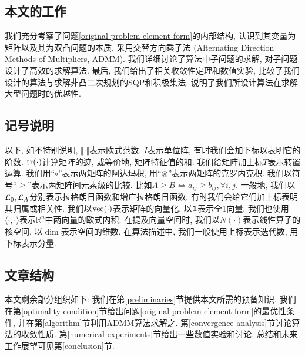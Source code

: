 \subsection{本文的工作}
我们充分考察了问题\eqref{original problem element form}的内部结构, 认识到其变量为矩阵以及其为双凸问题的本质, 采用交替方向乘子法 (Alternating Direction Methods of Multipliers, ADMM). 我们详细讨论了算法中子问题的求解, 对子问题设计了高效的求解算法. 最后, 我们给出了相关收敛性定理和数值实验, 比较了我们设计的算法与求解非凸二次规划的SQP和积极集法, 说明了我们所设计算法在求解大型问题时的优越性. 
\subsection{记号说明}
以下, 如不特别说明, $\Vert\cdot\Vert$表示欧式范数. $I$表示单位阵, 有时我们会加下标以表明它的阶数. $\mathrm{tr}(\cdot)$计算矩阵的迹, 或等价地, 矩阵特征值的和. 我们给矩阵加上标$T$表示转置运算. 我们用``$\circ$''表示两矩阵的阿达玛积, 用``$\otimes$''表示两矩阵的克罗内克积. 我们以符号``$\ge$''表示两矩阵间元素级的比较. 比如$A\ge B\Leftrightarrow a_{ij}\ge b_{ij},\forall i,j$. 一般地, 我们以$\mathcal{L}_0,\mathcal{L}_A$分别表示拉格朗日函数和增广拉格朗日函数. 有时我们会给它们加上标表明其归属或相关性. 我们以$\mathrm{vec}(\cdot)$表示矩阵的向量化, 以$\mathbf{1}$表示全1向量. 我们也使用$\langle\cdot,\cdot\rangle$表示$\mathbb{R}^n$中两向量的欧式内积. 在提及向量空间时, 我们以$N(\cdot)$表示线性算子的核空间, 以$\dim$表示空间的维数. 在算法描述中, 我们一般使用上标表示迭代数, 用下标表示分量.
\subsection{文章结构}
本文剩余部分组织如下: 我们在第\ref{preliminaries}节提供本文所需的预备知识. 我们在第\ref{optimality condition}节给出问题\eqref{original problem element form}的最优性条件, 并在第\ref{algorithm}节利用ADMM算法求解之. 第\ref{convergence analysis}节讨论算法的收敛性质. 第\ref{numerical experiments}节给出一些数值实验和讨论. 总结和未来工作展望可见第\ref{conclusion}节.